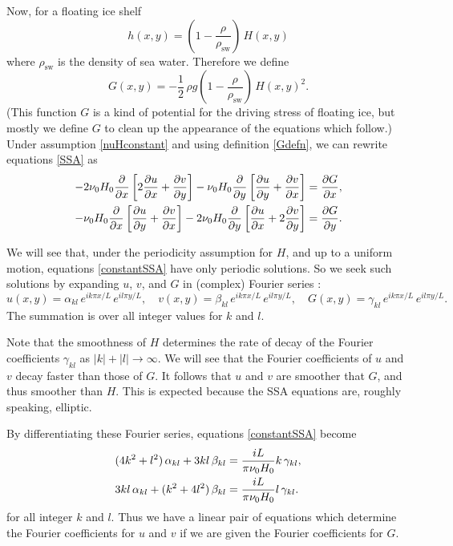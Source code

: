\documentclass[12pt]{amsart}%
\theoremstyle{plain}
\theoremstyle{definition}
\newcommand{\ddx}[1]{\ensuremath{\frac{\partial #1}{\partial x}}}
\newcommand{\ddy}[1]{\ensuremath{\frac{\partial #1}{\partial y}}}
\begin{document}
Now, for a floating ice shelf 
	$$h(x,y) = \left(1-\frac{\rho}{\rho_{\text{sw}}}\right)\, H(x,y)$$
where $\rho_{\text{sw}}$ is the density of sea water.  Therefore we define
\begin{equation}\label{Gdefn}
G(x,y) = - \frac{1}{2}\, \rho g \left(1-\frac{\rho}{\rho_{\text{sw}}}\right)\,  H(x,y)^2.
\end{equation}
(This function $G$ is a kind of potential for the driving stress of floating ice, but mostly we define $G$ to clean up the appearance of the equations which follow.)  Under assumption \eqref{nuHconstant} and using definition \eqref{Gdefn}, we can rewrite equations \eqref{SSA} as
\begin{align}\label{constantSSA}
 - 2 \nu_0 H_0 \ddx{}\left[2 \ddx{u} + \ddy{v}\right]
 - \nu_0 H_0 \ddy{}\left[\ddy{u} + \ddx{v}\right] &= \ddx{G}, \\
 - \nu_0 H_0 \ddx{}\left[\ddy{u} + \ddx{v}\right]
 - 2 \nu_0 H_0 \ddy{}\left[\ddx{u} + 2 \ddy{v}\right] &= \ddy{G}.\notag
\end{align}

We will see that, under the periodicity assumption for $H$, and up to a uniform motion, equations \eqref{constantSSA} have only periodic solutions.  So we seek such solutions by expanding $u$, $v$, and $G$ in (complex) Fourier series \cite{BrownChurchill}:
	$$u(x,y) = \alpha_{kl}\, e^{ik\pi x/L}\, e^{il\pi y/L}, \quad v(x,y) = \beta_{kl}\, e^{ik\pi x/L}\, e^{il\pi y/L}, \quad G(x,y) = \gamma_{kl}\, e^{ik\pi x/L}\, e^{il\pi y/L}.$$
The summation is over all integer values for $k$ and $l$.

Note that the smoothness of $H$ determines the rate of decay of the Fourier coefficients $\gamma_{kl}$ as $|k|+|l|\to\infty$.  We will see that the Fourier coefficients of $u$ and $v$ decay faster than those of $G$.  It follows that $u$ and $v$ are smoother that $G$, and thus smoother than $H$.  This is expected because the SSA equations are, roughly speaking, elliptic.

By differentiating these Fourier series, equations \eqref{constantSSA} become
\begin{align}\label{fourierSSA}
(4 k^2 + l^2) \,\alpha_{kl}  + 3 kl \,\beta_{kl}  &= \frac{iL}{\pi \nu_0 H_0} k\, \gamma_{kl}, \\
3 kl \,\alpha_{kl}  + (k^2 + 4 l^2) \,\beta_{kl}  &= \frac{iL}{\pi \nu_0 H_0} l\, \gamma_{kl}. \notag
\end{align}
for all integer $k$ and $l$.  Thus we have a linear pair of equations which determine the Fourier coefficients for $u$ and $v$ if we are given the Fourier coefficients for $G$.
\end{document}

